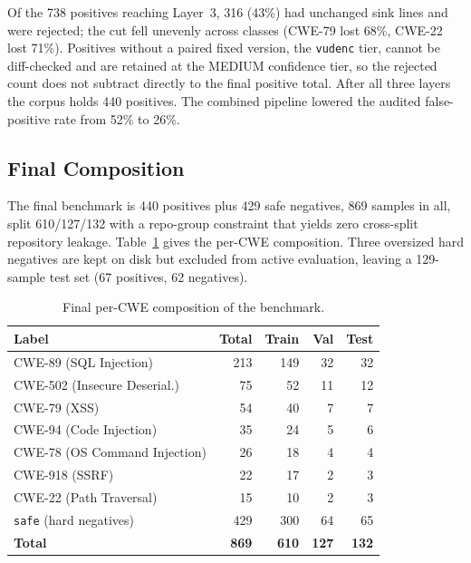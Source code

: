 Of the 738 positives reaching Layer~3, 316 (43\%) had unchanged sink lines and
were rejected; the cut fell unevenly across classes (CWE-79 lost 68\%, CWE-22
lost 71\%). Positives without a paired fixed version, the \texttt{vudenc} tier,
cannot be diff-checked and are retained at the MEDIUM confidence tier, so the
rejected count does not subtract directly to the final positive total. After all
three layers the corpus holds 440 positives. The combined pipeline lowered the
audited false-positive rate from 52\% to 26\%.

\subsection{Final Composition}

The final benchmark is 440 positives plus 429 safe negatives, 869 samples in
all, split 610/127/132 with a repo-group constraint that yields zero cross-split
repository leakage. Table~\ref{tab:composition} gives the per-CWE composition.
Three oversized hard negatives are kept on disk but excluded from active
evaluation, leaving a 129-sample test set (67 positives, 62 negatives).

\begin{table}[htb]
\caption{Final per-CWE composition of the benchmark.}
\label{tab:composition}
\centering
\begin{tabular}{lrrrr}
\toprule
\textbf{Label} & \textbf{Total} & \textbf{Train} & \textbf{Val} & \textbf{Test} \\
\midrule
CWE-89 (SQL Injection)             & 213 & 149 & 32 & 32 \\
CWE-502 (Insecure Deserial.)       &  75 &  52 & 11 & 12 \\
CWE-79 (XSS)                       &  54 &  40 &  7 &  7 \\
CWE-94 (Code Injection)            &  35 &  24 &  5 &  6 \\
CWE-78 (OS Command Injection)      &  26 &  18 &  4 &  4 \\
CWE-918 (SSRF)                     &  22 &  17 &  2 &  3 \\
CWE-22 (Path Traversal)            &  15 &  10 &  2 &  3 \\
\texttt{safe} (hard negatives)     & 429 & 300 & 64 & 65 \\
\midrule
\textbf{Total}                     & \textbf{869} & \textbf{610} & \textbf{127} & \textbf{132} \\
\bottomrule
\end{tabular}
\end{table}

